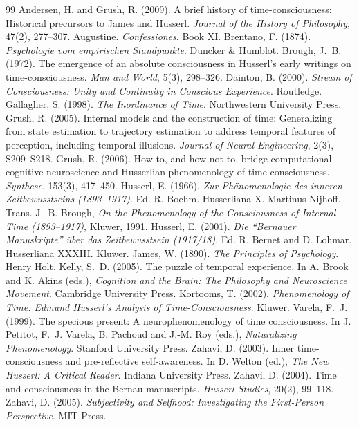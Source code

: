\documentclass{situationist-preprint}
\begin{document}
\begin{thebibliography}{99}\small
{} Andersen, H. and Grush, R. (2009). A brief history of time-consciousness: Historical precursors to James and Husserl. \emph{Journal of the History of Philosophy}, 47(2), 277--307.
 Augustine. \emph{Confessiones}. Book XI.
 Brentano, F. (1874). \emph{Psychologie vom empirischen Standpunkte}. Duncker \& Humblot.
 Brough, J.~B. (1972). The emergence of an absolute consciousness in Husserl's early writings on time-consciousness. \emph{Man and World}, 5(3), 298--326.
 Dainton, B. (2000). \emph{Stream of Consciousness: Unity and Continuity in Conscious Experience}. Routledge.
 Gallagher, S. (1998). \emph{The Inordinance of Time}. Northwestern University Press.
 Grush, R. (2005). Internal models and the construction of time: Generalizing from state estimation to trajectory estimation to address temporal features of perception, including temporal illusions. \emph{Journal of Neural Engineering}, 2(3), S209--S218.
 Grush, R. (2006). How to, and how not to, bridge computational cognitive neuroscience and Husserlian phenomenology of time consciousness. \emph{Synthese}, 153(3), 417--450.
 Husserl, E. (1966). \emph{Zur Ph\"anomenologie des inneren Zeitbewusstseins (1893--1917)}. Ed. R. Boehm. Husserliana X. Martinus Nijhoff. Trans. J.~B. Brough, \emph{On the Phenomenology of the Consciousness of Internal Time (1893--1917)}, Kluwer, 1991.
 Husserl, E. (2001). \emph{Die \enquote{Bernauer Manuskripte} \"uber das Zeitbewusstsein (1917/18)}. Ed. R. Bernet and D. Lohmar. Husserliana XXXIII. Kluwer.
 James, W. (1890). \emph{The Principles of Psychology}. Henry Holt.
 Kelly, S.~D. (2005). The puzzle of temporal experience. In A. Brook and K. Akins (eds.), \emph{Cognition and the Brain: The Philosophy and Neuroscience Movement}. Cambridge University Press.
 Kortooms, T. (2002). \emph{Phenomenology of Time: Edmund Husserl's Analysis of Time-Consciousness}. Kluwer.
 Varela, F.~J. (1999). The specious present: A neurophenomenology of time consciousness. In J. Petitot, F.~J. Varela, B. Pachoud and J.-M. Roy (eds.), \emph{Naturalizing Phenomenology}. Stanford University Press.
 Zahavi, D. (2003). Inner time-consciousness and pre-reflective self-awareness. In D. Welton (ed.), \emph{The New Husserl: A Critical Reader}. Indiana University Press.
 Zahavi, D. (2004). Time and consciousness in the Bernau manuscripts. \emph{Husserl Studies}, 20(2), 99--118.
 Zahavi, D. (2005). \emph{Subjectivity and Selfhood: Investigating the First-Person Perspective}. MIT Press.
\end{thebibliography}
\end{document}
